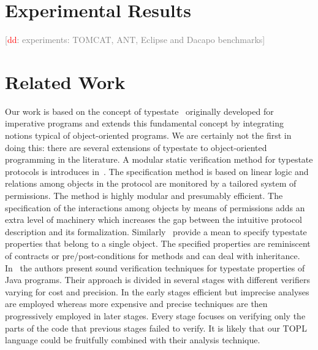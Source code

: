 \documentclass[10pt]{llncs} %
\newcommand{\noterg}[2]{\textcolor{gray}{[\textcolor{red}{#1}: #2]}}
\newcommand{\dd}[1]{\noterg{dd}{#1}}
\newcommand{\dinocomment}[1]{\dd{#1}}
\begin{document}
\section{Experimental Results}

\dinocomment{experiments: TOMCAT, ANT, Eclipse and Dacapo benchmarks}

\section{Related Work}\label{sec:related} %
Our work is based on the concept of typestate~\cite{strom1986} originally developed for imperative programs and extends this fundamental concept by integrating notions typical of object-oriented programs. 
We are certainly not the first in doing this: there are several extensions of typestate to object-oriented programming in the literature.
A modular static verification method for typestate protocols is introduces in~\cite{dblp:conf/oopsla/bierhoffa07}. 
The specification method is based on linear logic and relations among objects in the protocol are monitored by a tailored system of permissions. 
The method is highly modular and presumably efficient. The specification of the interactions among objects by means of permissions adds an extra level of machinery which increases the gap between the intuitive protocol description and its formalization. Similarly~\cite{deline2004,dblp:conf/sigsoft/BierhoffA05} provide a mean to specify typestate properties that belong to a single object. The specified properties are reminiscent of contracts or pre/post-conditions for methods and
can deal with inheritance.
In~\cite{dblp:conf/issta/FinkYDRG06} the authors present sound verification techniques for typestate properties of Java  programs.
Their approach is divided in several stages with different verifiers varying for cost and precision.
In the early stages efficient but imprecise analyses are employed whereas
more expensive and precise techniques are then progressively employed in later stages.
Every stage focuses on verifying only the parts of the code that previous stages failed to verify.
It is likely that our TOPL language could be fruitfully combined with their analysis technique.
\end{document}
